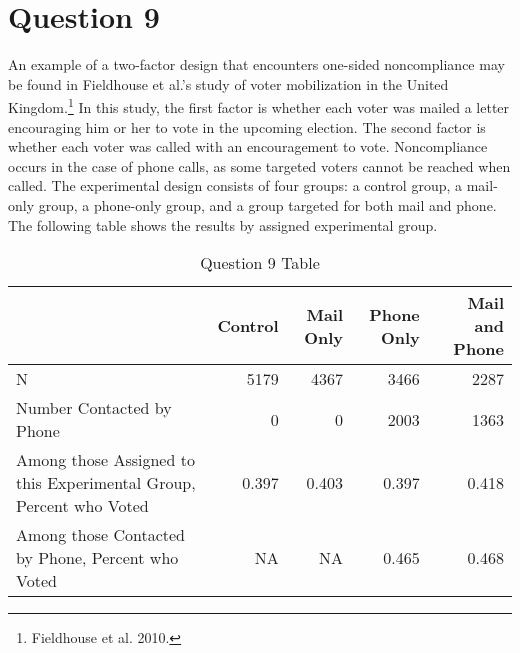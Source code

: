 \documentclass[11pt,notitlepage]{article}\usepackage[]{graphicx}\usepackage[]{color}
\begin{document}
\section*{Question 9}
An example of a two-factor design that encounters one-sided noncompliance may be found in Fieldhouse et al.'s study of voter mobilization in the United Kingdom.\footnote{Fieldhouse et al. 2010.} In this study, the first factor is whether each voter was mailed a letter encouraging him or her to vote in the upcoming election. The second factor is whether each voter was called with an encouragement to vote. Noncompliance occurs in the case of phone calls, as some targeted voters cannot be reached when called. The experimental design consists of four groups: a control group, a mail-only group, a phone-only group, and a group targeted for both mail and phone. The following table shows the results by assigned experimental group.
\begin{table}[htbp]
  \centering
  \caption{Question 9 Table}
    \begin{tabular}{R{5cm}rrrr}
    \toprule
          & Control  & Mail Only  & Phone Only  & Mail and Phone  \\
    \midrule
    N     & 5179  & 4367  & 3466  & 2287 \\
    Number Contacted by Phone  & 0     & 0     & 2003  & 1363 \\
    Among those Assigned to this Experimental Group, Percent who Voted  & 0.397 & 0.403 & 0.397 & 0.418 \\
    Among those Contacted by Phone, Percent who Voted  & NA    & NA    & 0.465 & 0.468 \\
    \bottomrule
    \end{tabular}%
  \label{tab:addlabel}%
\end{table}%
\end{document}
